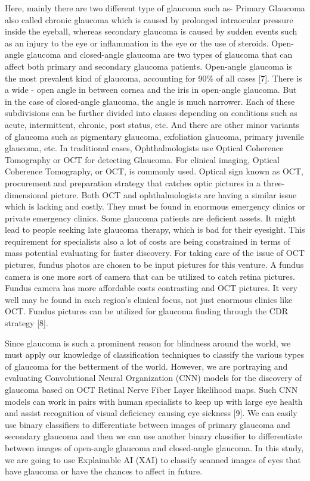\vspace{5mm}
\noindent Here, mainly there are two different type of glaucoma such as- Primary Glaucoma also called chronic glaucoma which is caused by prolonged intraocular pressure inside the eyeball, whereas secondary glaucoma is caused by sudden events such as an injury to the eye or inflammation in the eye or the use of steroids. Open-angle glaucoma and closed-angle glaucoma are two types of glaucoma that can affect both primary and secondary glaucoma patients. Open-angle glaucoma is the most prevalent kind of glaucoma, accounting for 90\% of all cases [7]. There is a wide - open angle in between cornea and the iris in open-angle glaucoma. But in the case of closed-angle glaucoma, the angle is much narrower. Each of these subdivisions can be further divided into classes depending on conditions such as acute, intermittent, chronic, post status, etc. And there are other minor variants of glaucoma such as pigmentary glaucoma, exfoliation glaucoma, primary juvenile glaucoma, etc. In traditional cases, Ophthalmologists use Optical Coherence Tomography or OCT for detecting Glaucoma. For clinical imaging, Optical Coherence Tomography, or OCT, is commonly used. Optical sign known as OCT, procurement and preparation strategy that catches optic pictures in a three-dimensional picture. Both OCT and ophthalmologists are having a similar issue which is lacking and costly. They must be found in enormous emergency clinics or private emergency clinics. Some glaucoma patients are deficient assets. It might lead to people seeking late glaucoma therapy, which is bad for their eyesight. This requirement for specialists also a lot of costs are being constrained in terms of mass potential evaluating for faster discovery. For taking care of the issue of OCT pictures, fundus photos are chosen to be input pictures for this venture. A fundus camera is one more sort of camera that can be utilized to catch retina pictures. Fundus camera has more affordable costs contrasting and OCT pictures. It very well may be found in each region’s clinical focus, not just enormous clinics like OCT. Fundus pictures can be utilized for glaucoma finding through the CDR strategy [8].

\vspace{5mm}
\noindent Since glaucoma is such a prominent reason for blindness around the world, we must apply our knowledge of classification techniques to classify the various types of glaucoma for the betterment of the world. However, we are portraying and evaluating Convolutional Neural Organization (CNN) models for the discovery of glaucoma based on OCT Retinal Nerve Fiber Layer likelihood maps. Such CNN models can work in pairs with human specialists to keep up with large eye health and assist recognition of visual deficiency causing eye sickness [9]. We can easily use binary classifiers to differentiate between images of primary glaucoma and secondary glaucoma and then we can use another binary classifier to differentiate between images of open-angle glaucoma and closed-angle glaucoma. In this study, we are going to use Explainable AI (XAI) to classify scanned images of eyes that have glaucoma or have the chances to affect in future.

